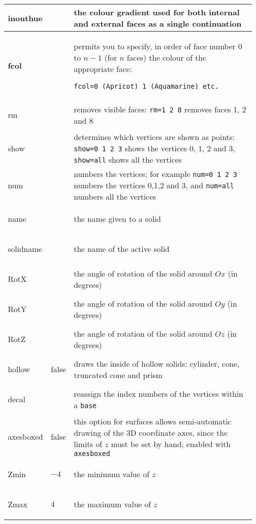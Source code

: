 \begin{longtable}{|>{\bfseries\ttfamily\color{blue}}l
 |>{\ttfamily\centering}m{2cm}|m{10cm}|}
inouthue&&the colour gradient used for both internal and
external faces as a single continuation\\
\hline

fcol&&permits you to specify, in order of face number $0$ to $n-1$
(for $n$ faces) the colour of the appropriate face:\par
\texttt{fcol=0 (Apricot) 1 (Aquamarine) etc.}\\ \hline

rm&&removes visible faces: \texttt{rm=1 2 8} removes faces 1, 2
and 8 \\ \hline

show&&determines which vertices are shown as points:
\texttt{show=0 1 2 3} shows the vertices 0, 1, 2 and 3,
\texttt{show=all} shows all the vertices\\ \hline

num&&numbers the vertices; for example \texttt{num=0 1 2 3}
numbers the vertices 0,1,2 and 3, and \texttt{num=all} numbers
all the vertices\\ \hline

name&&the name given to a solid\\ \hline

solidname&&the name of the active solid\\ \hline

RotX&0&the angle of rotation of the solid around $Ox$ (in
degrees)\\ \hline

RotY&0&the angle of rotation of the solid around $Oy$ (in
degrees)\\ \hline

RotZ&0&the angle of rotation of the solid around $Oz$ (in
degrees)\\ \hline

hollow&false& draws the inside of hollow solids: cylinder, cone,
truncated cone and prism\\ \hline

decal&-2&reassign the index numbers of the vertices within a \texttt{base}\\
\hline

axesboxed& false& this option for surfaces allows semi-automatic
drawing of the 3D coordinate axes, since the limits of $z$ must be
set by
hand; enabled with \texttt{axesboxed}\\
\hline

Zmin&$-4$& the minimum value of $z$\\ \hline

Zmax&$4$& the maximum value of $z$\\ \hline


\end{longtable}
